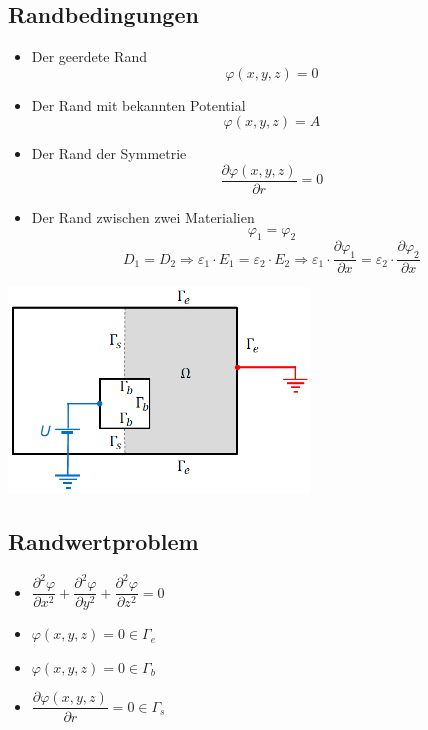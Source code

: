 \subsection{Randbedingungen}
\begin{minipage}{8cm}
	\begin{itemize}
		\item Der geerdete Rand \[\varphi(x,y,z) = 0\]
		\item Der Rand mit bekannten Potential \[ \varphi(x,y,z) = A \]
		\item Der Rand der Symmetrie \[ \dfrac{\partial\varphi(x,y,z)}{\partial r} = 0\]
		\item Der Rand zwischen zwei Materialien \[\varphi_{1}=\varphi_{2}\]
		\[ D_1 = D_2 \Rightarrow \varepsilon_1 \cdot E_{1}=\varepsilon_2 \cdot E_{2} \Rightarrow \varepsilon_1\cdot\dfrac{\partial\varphi_1}{\partial x} = \varepsilon_2\cdot\dfrac{\partial\varphi_2}{\partial x}\]
	\end{itemize}
\end{minipage}
\begin{minipage}{8cm}
	\includegraphics[width=8cm]{images/randbedinung_ES.png}
\end{minipage}
\subsection{Randwertproblem}
\begin{multicols}{2}
\begin{itemize}
	\item $\dfrac{\partial^2\varphi}{\partial x^2} +  \dfrac{\partial^2\varphi}{\partial y^2} + \dfrac{\partial^2\varphi}{\partial z^2}=0 $
	\item $\varphi(x,y,z)=0 \in \Gamma_e$
	\item $\varphi(x,y,z)=0 \in \Gamma_b$
	\item $ \dfrac{\partial\varphi(x,y,z)}{\partial r} = 0 \in \Gamma_s$
\end{itemize}
\end{multicols}
